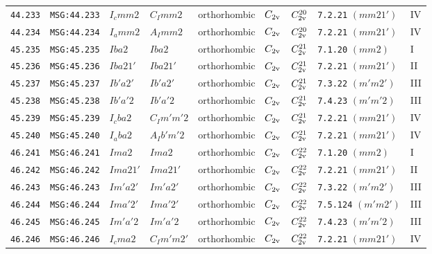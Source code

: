 \documentclass[fleqn,10pt]{jsarticle}
\begin{document}
\begin{center}
\begin{longtable}{lllllllll}
\texttt{44.233} & \texttt{MSG:44.233} & $I_{c}mm2$ & $C_{I}mm2$ & orthorhombic & $C_{\rm 2v}$ & $C_{\rm 2v}^{20}$ & \texttt{7.2.21} $(mm21')$ & IV \\
\texttt{44.234} & \texttt{MSG:44.234} & $I_{a}mm2$ & $A_{I}mm2$ & orthorhombic & $C_{\rm 2v}$ & $C_{\rm 2v}^{20}$ & \texttt{7.2.21} $(mm21')$ & IV \\ \hline
\texttt{45.235} & \texttt{MSG:45.235} & $Iba2$ & $Iba2$ & orthorhombic & $C_{\rm 2v}$ & $C_{\rm 2v}^{21}$ & \texttt{7.1.20} $(mm2)$ & I \\
\texttt{45.236} & \texttt{MSG:45.236} & $Iba21'$ & $Iba21'$ & orthorhombic & $C_{\rm 2v}$ & $C_{\rm 2v}^{21}$ & \texttt{7.2.21} $(mm21')$ & II \\
\texttt{45.237} & \texttt{MSG:45.237} & $Ib'a2'$ & $Ib'a2'$ & orthorhombic & $C_{\rm 2v}$ & $C_{\rm 2v}^{21}$ & \texttt{7.3.22} $(m'm2')$ & III \\
\texttt{45.238} & \texttt{MSG:45.238} & $Ib'a'2$ & $Ib'a'2$ & orthorhombic & $C_{\rm 2v}$ & $C_{\rm 2v}^{21}$ & \texttt{7.4.23} $(m'm'2)$ & III \\
\texttt{45.239} & \texttt{MSG:45.239} & $I_{c}ba2$ & $C_{I}m'm'2$ & orthorhombic & $C_{\rm 2v}$ & $C_{\rm 2v}^{21}$ & \texttt{7.2.21} $(mm21')$ & IV \\
\texttt{45.240} & \texttt{MSG:45.240} & $I_{a}ba2$ & $A_{I}b'm'2$ & orthorhombic & $C_{\rm 2v}$ & $C_{\rm 2v}^{21}$ & \texttt{7.2.21} $(mm21')$ & IV \\ \hline
\texttt{46.241} & \texttt{MSG:46.241} & $Ima2$ & $Ima2$ & orthorhombic & $C_{\rm 2v}$ & $C_{\rm 2v}^{22}$ & \texttt{7.1.20} $(mm2)$ & I \\
\texttt{46.242} & \texttt{MSG:46.242} & $Ima21'$ & $Ima21'$ & orthorhombic & $C_{\rm 2v}$ & $C_{\rm 2v}^{22}$ & \texttt{7.2.21} $(mm21')$ & II \\
\texttt{46.243} & \texttt{MSG:46.243} & $Im'a2'$ & $Im'a2'$ & orthorhombic & $C_{\rm 2v}$ & $C_{\rm 2v}^{22}$ & \texttt{7.3.22} $(m'm2')$ & III \\
\texttt{46.244} & \texttt{MSG:46.244} & $Ima'2'$ & $Ima'2'$ & orthorhombic & $C_{\rm 2v}$ & $C_{\rm 2v}^{22}$ & \texttt{7.5.124} $(m'm2')$ & III \\
\texttt{46.245} & \texttt{MSG:46.245} & $Im'a'2$ & $Im'a'2$ & orthorhombic & $C_{\rm 2v}$ & $C_{\rm 2v}^{22}$ & \texttt{7.4.23} $(m'm'2)$ & III \\
\texttt{46.246} & \texttt{MSG:46.246} & $I_{c}ma2$ & $C_{I}m'm2'$ & orthorhombic & $C_{\rm 2v}$ & $C_{\rm 2v}^{22}$ & \texttt{7.2.21} $(mm21')$ & IV \\

\end{longtable}
\end{center}
\end{document}
